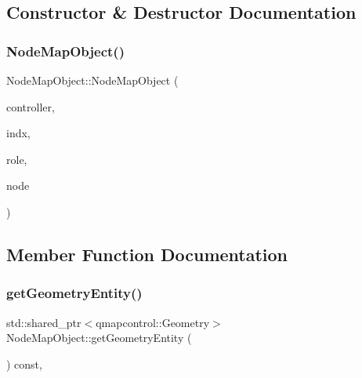 \subsection{Constructor \& Destructor Documentation}
\mbox{\label{class_node_map_object_a413e339f70708ea67366483736a2ca0f}} 
\subsubsection{\texorpdfstring{NodeMapObject()}{NodeMapObject()}}
{\footnotesize\ttfamily Node\+Map\+Object\+::\+Node\+Map\+Object (\begin{DoxyParamCaption}\item[{\mbox{\hyperlink{class_map_objects_controller}{Map\+Objects\+Controller}} $\ast$}]{controller,  }\item[{int}]{indx,  }\item[{\mbox{\hyperlink{class_node_map_object_a654b2381e7c128e1c9406dd892104a69}{Role}}}]{role,  }\item[{std\+::shared\+\_\+ptr$<$ \mbox{\hyperlink{class_node_data}{Node\+Data}} $>$}]{node }\end{DoxyParamCaption})}



\subsection{Member Function Documentation}
\mbox{\label{class_node_map_object_af6707ce2743bea4f8921d0cb124f29c9}} 
\subsubsection{\texorpdfstring{getGeometryEntity()}{getGeometryEntity()}}
{\footnotesize\ttfamily std\+::shared\+\_\+ptr$<$qmapcontrol\+::\+Geometry$>$ Node\+Map\+Object\+::get\+Geometry\+Entity (\begin{DoxyParamCaption}{ }\end{DoxyParamCaption}) const\hspace{0.3cm}{\ttfamily [inline]}, {\ttfamily [virtual]}}



